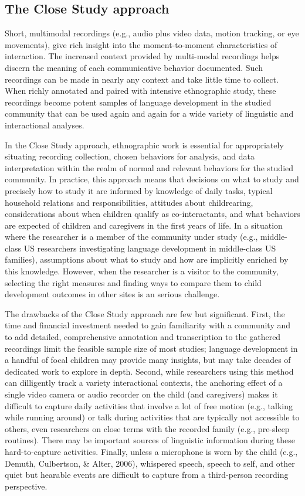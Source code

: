 \documentclass[,man,floatsintext]{apa6}
\begin{document}
\subsection{The Close Study approach}\label{the-close-study-approach}

Short, multimodal recordings (e.g., audio plus video data, motion
tracking, or eye movements), give rich insight into the moment-to-moment
characteristics of interaction. The increased context provided by
multi-modal recordings helps discern the meaning of each communicative
behavior documented. Such recordings can be made in nearly any context
and take little time to collect. When richly annotated and paired with
intensive ethnographic study, these recordings become potent samples of
language development in the studied community that can be used again and
again for a wide variety of linguistic and interactional analyses.

In the Close Study approach, ethnographic work is essential for
appropriately situating recording collection, chosen behaviors for
analysis, and data interpretation within the realm of normal and
relevant behaviors for the studied community. In practice, this approach
means that decisions on what to study and precisely how to study it are
informed by knowledge of daily tasks, typical household relations and
responsibilities, attitudes about childrearing, considerations about
when children qualify as co-interactants, and what behaviors are
expected of children and caregivers in the first years of life. In a
situation where the researcher is a member of the community under study
(e.g., middle-class US researchers investigating language development in
middle-class US families), assumptions about what to study and how are
implicitly enriched by this knowledge. However, when the researcher is a
visitor to the community, selecting the right measures and finding ways
to compare them to child development outcomes in other sites is an
serious challenge.

The drawbacks of the Close Study approach are few but significant.
First, the time and financial investment needed to gain familiarity with
a community and to add detailed, comprehensive annotation and
transcription to the gathered recordings limit the feasible sample size
of most studies; language development in a handful of focal children may
provide many insights, but may take decades of dedicated work to explore
in depth. Second, while researchers using this method can dilligently
track a variety interactional contexts, the anchoring effect of a single
video camera or audio recorder on the child (and caregivers) makes it
difficult to capture daily activities that involve a lot of free motion
(e.g., talking while running around) or talk during activities that are
typically not accessible to others, even researchers on close terms with
the recorded family (e.g., pre-sleep routines). There may be important
sources of linguistic information during these hard-to-capture
activities. Finally, unless a microphone is worn by the child (e.g.,
Demuth, Culbertson, \& Alter, 2006), whispered speech, speech to self,
and other quiet but hearable events are difficult to capture from a
third-person recording perspective.
\end{document}
